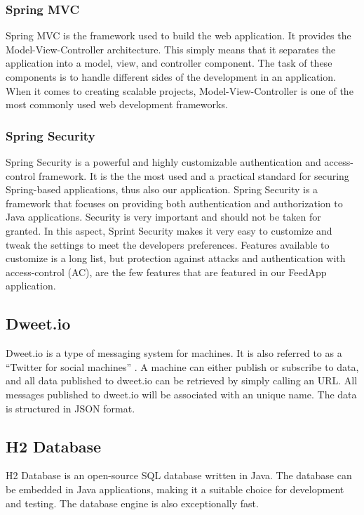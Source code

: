\subsubsection{Spring MVC}
Spring MVC is the framework used to build the web application. It provides the Model-View-Controller architecture. This simply means that it separates the application into a model, view, and controller component. The task of these components is to handle different sides of the development in an application. When it comes to creating scalable projects, Model-View-Controller is one of the most commonly used web development frameworks.
\subsubsection{Spring Security}
Spring Security is a powerful and highly customizable authentication and access-control framework. It is the the most used and a practical standard for securing Spring-based applications, thus also our application. Spring Security is a framework that focuses on providing both authentication and authorization to Java applications.\cite{springsecurity} Security is very important and should not be taken for granted. In this aspect, Sprint Security makes it very easy to customize and tweak the settings to meet the developers preferences. Features available to customize is a long list, but protection against attacks and authentication with access-control (AC), are the few features that are featured in our FeedApp application.
\subsection{Dweet.io}
\label{sub:dweet}
Dweet.io is a type of messaging system for machines. It is also referred to as a “Twitter for social machines” \cite{dweet}. A machine can either publish or subscribe to data, and all data published to dweet.io can be retrieved by simply calling an URL. All messages published to dweet.io will be associated with an unique name. The data is structured in JSON format. 

\subsection{H2 Database}
\label{sub:h2db}
H2 Database is an open-source SQL database written in Java. The database can be embedded in Java applications, making it a suitable choice for development and testing. The database engine is also exceptionally fast. \cite{h2db} 

